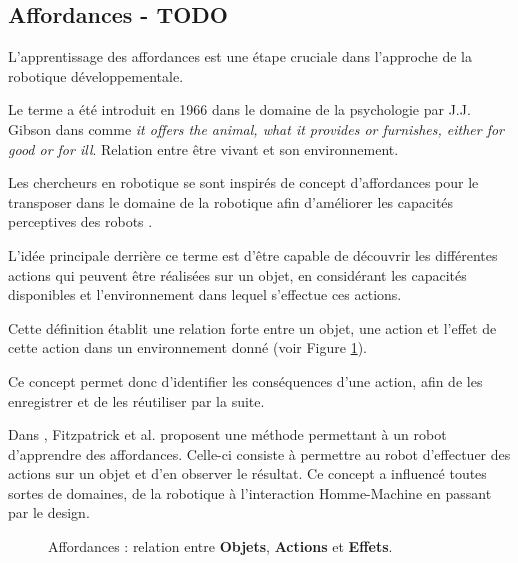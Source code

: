 \documentclass[draft]{llncs}
\begin{document}
\subsection{Affordances - TODO}

L'apprentissage des affordances est une étape cruciale dans l'approche de la robotique développementale.

Le terme a été introduit en 1966 dans le domaine de la psychologie par J.J. Gibson dans \cite{opac-b1085639} comme \textit{it offers the animal, what it provides or furnishes, either for good or for ill}.
Relation entre être vivant et son environnement.

Les chercheurs en robotique se sont inspirés de concept d'affordances pour le transposer dans le domaine de la robotique afin d'améliorer les capacités perceptives des robots \cite{Jamone2016}.

L'idée principale derrière ce terme est d'être capable de découvrir les différentes actions qui peuvent être réalisées sur un objet, en considérant les capacités disponibles et l'environnement dans lequel s'effectue ces actions.

Cette définition établit une relation forte entre un objet, une action et l'effet de cette action dans un environnement donné (voir Figure \ref{fig:affordances}).

Ce concept permet donc d'identifier les conséquences d'une action, afin de les enregistrer et de les réutiliser par la suite.

Dans \cite{Fitzpatrick2003}, Fitzpatrick et al. proposent une méthode permettant à un robot d'apprendre des affordances.
Celle-ci consiste à permettre au robot d'effectuer des actions sur un objet et d'en observer le résultat.
Ce concept a influencé toutes sortes de domaines, de la robotique à l'interaction Homme-Machine en passant par le design.

\begin{figure}
  \centering

  \label{fig:affordances}
	\caption{Affordances : relation entre \textbf{Objets}, \textbf{Actions} et \textbf{Effets}.}

\end{figure}
\end{document}
